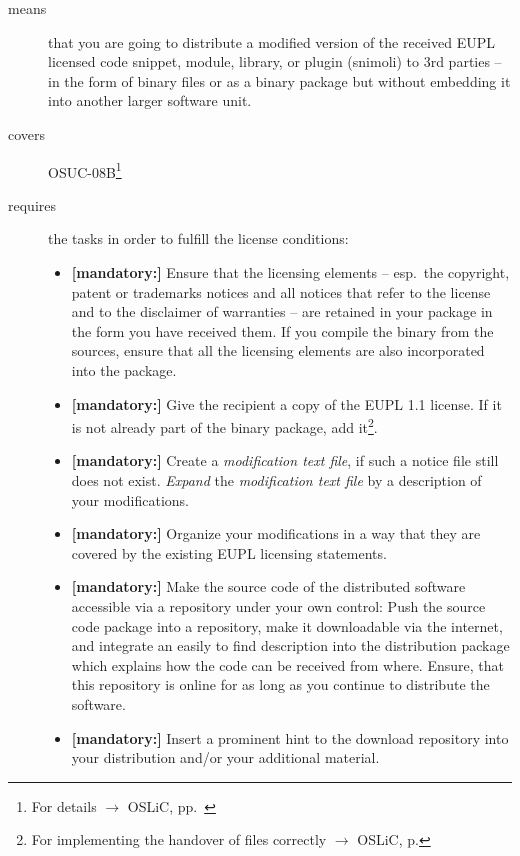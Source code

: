 \begin{description}
\item[means] that you are going to distribute a modified version of the received
EUPL licensed code snippet, module, library, or plugin (snimoli) to 3rd parties
-- in the form of binary files or as a binary package but without embedding it
into another larger software unit.
\item[covers] OSUC-08B\footnote{For details $\rightarrow$ OSLiC, pp.\ \pageref{OSUC-08B-DEF}}
\item[requires] the tasks in order to fulfill the license conditions:
\begin{itemize}

  \item \textbf{[mandatory:]} Ensure that the licensing elements -- esp.\ the
  copyright, patent or trademarks notices and all notices that refer to the
  license and to the disclaimer of warranties -- are retained in your package in
  the form you have received them. If you compile the binary from the sources,
  ensure that all the licensing elements are also incorporated into the package.
  
 \item \textbf{[mandatory:]} Give the recipient a copy of the EUPL 1.1
  license. If it is not already part of the binary package, add
  it\footnote{For implementing the handover of files correctly $\rightarrow$
  OSLiC, p. \pageref{DistributingFilesHint}}.

  \item \textbf{[mandatory:]} Create a \emph{modification text file}, if such a
  notice file still does not exist. \emph{Expand} the \emph{modification text
  file} by a description of your modifications.

  \item \textbf{[mandatory:]} Organize your modifications in a way that they are
  covered by the existing EUPL licensing statements.
  
  \item \textbf{[mandatory:]} Make the source code of the distributed software
  accessible via a repository under your own control: Push the source code
  package into a repository, make it downloadable via the internet, and
  integrate an easily to find description into the distribution package which
  explains how the code can be received from where. Ensure, that this repository
  is online for as long as you continue to distribute the software.
  
  \item \textbf{[mandatory:]} Insert a prominent hint to the download repository
  into your distribution and/or your additional material.


\end{itemize}
\end{description}
